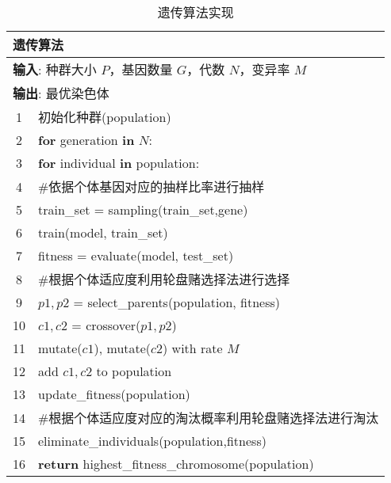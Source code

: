 \begin{table}[htbp]
	\caption{遗传算法实现}
	\label{tab:genetic_algorithm}
	\centering
	\begin{tabularx}{1.0\textwidth}{cl}
		\toprule
		\multicolumn{2}{l}{\textbf{遗传算法}}                                               \\
		\midrule
		\multicolumn{2}{l}{\textbf{输入}: 种群大小 $P$，基因数量 $G$，代数 $N$，变异率 $M$} \\
		\multicolumn{2}{l}{\textbf{输出}: 最优染色体}                                       \\
		1  & 初始化种群(population)                                                         \\
		2  & \textbf{for} generation \textbf{in} $N$:                                       \\
		3  & \quad \textbf{for} individual \textbf{in} population:                          \\
		4  & \quad\quad \#依据个体基因对应的抽样比率进行抽样                                \\
		5  & \quad\quad train\_set = sampling(train\_set,gene)                              \\
		6  & \quad\quad train(model, train\_set)                                            \\
		7  & \quad\quad fitness = evaluate(model, test\_set)                                \\
		8  & \quad \#根据个体适应度利用轮盘赌选择法进行选择                                 \\
		9  & \quad $p1, p2$ = select\_parents(population, fitness)                          \\
		10 & \quad $c1, c2$ = crossover($p1, p2$)                                           \\
		11 & \quad mutate($c1$), mutate($c2$) with rate $M$                                 \\
		12 & \quad add $c1, c2$ to population                                               \\
		13 & \quad update\_fitness(population)                                              \\
		14 & \quad \#根据个体适应度对应的淘汰概率利用轮盘赌选择法进行淘汰                   \\
		15 & \quad eliminate\_individuals(population,fitness)                               \\
		16 & \textbf{return} highest\_fitness\_chromosome(population)                       \\
		\bottomrule
	\end{tabularx}
\end{table}

